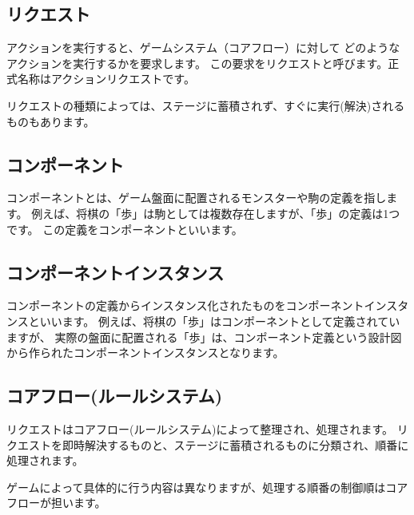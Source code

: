 \documentclass[letterpaper,10pt,dvipdfmx]{sphinxmanual}
\begin{document}
\subsection{リクエスト}
\label{\detokenize{core/core:index-4}}\label{\detokenize{core/core:id7}}
\sphinxAtStartPar
アクションを実行すると、ゲームシステム（コアフロー）に対して
どのようなアクションを実行するかを要求します。
この要求をリクエストと呼びます。正式名称はアクションリクエストです。

\sphinxAtStartPar
リクエストの種類によっては、ステージに蓄積されず、すぐに実行(解決)されるものもあります。

\ignorespaces 

\subsection{コンポーネント}
\label{\detokenize{core/core:component}}\label{\detokenize{core/core:index-5}}\label{\detokenize{core/core:id8}}
\sphinxAtStartPar
コンポーネントとは、ゲーム盤面に配置されるモンスターや駒の定義を指します。
例えば、将棋の「歩」は駒としては複数存在しますが、「歩」の定義は1つです。
この定義をコンポーネントといいます。

\ignorespaces 

\subsection{コンポーネントインスタンス}
\label{\detokenize{core/core:index-6}}\label{\detokenize{core/core:id9}}
\sphinxAtStartPar
コンポーネントの定義からインスタンス化されたものをコンポーネントインスタンスといいます。
例えば、将棋の「歩」はコンポーネントとして定義されていますが、
実際の盤面に配置される「歩」は、コンポーネント定義という設計図から作られたコンポーネントインスタンスとなります。


\subsection{コアフロー(ルールシステム)}
\label{\detokenize{core/core:id10}}
\sphinxAtStartPar
リクエストはコアフロー(ルールシステム)によって整理され、処理されます。
リクエストを即時解決するものと、ステージに蓄積されるものに分類され、順番に処理されます。

\sphinxAtStartPar
ゲームによって具体的に行う内容は異なりますが、処理する順番の制御順はコアフローが担います。
\end{document}
